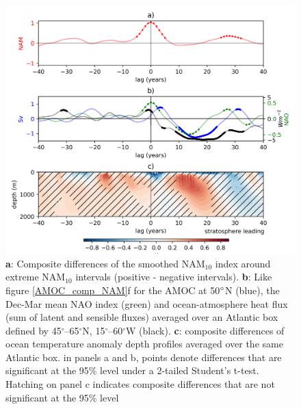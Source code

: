 \begin{figure}[h!]
\begin{center}
\noindent\includegraphics[width = 0.7\linewidth]{Figures/Figures-surface/Ocean_T_AMOC_NAO_responses_FINAL.png} 
\caption[Lagged response of the NAO, heat flux and ocean T to NAM$_{10}$ intervals.]{\textbf{a}: Composite differences of the smoothed NAM$_{10}$ index around extreme NAM$_{10}$ intervals (positive - negative intervals).
\textbf{b}: Like figure \ref{AMOC_comp_NAM}f for the AMOC at 50$\degree$N (blue), the Dec-Mar mean NAO index (green) and ocean-atmosphere heat flux (sum of latent and sensible fluxes) averaged over an Atlantic box defined by 45$^{\circ}$–65$^{\circ}$N, 15$^{\circ}$–60$^{\circ}$W (black). \textbf{c}: composite differences of ocean temperature anomaly depth profiles averaged over the same Atlantic box. in panels a and b, points denote differences that are significant at the 95\% level under a 2-tailed Student's t-test. Hatching on panel c indicates composite differences that are not significant at the 95\% level}
\label{NAO_AMOC_T_response}
\end{center}
\end{figure}

